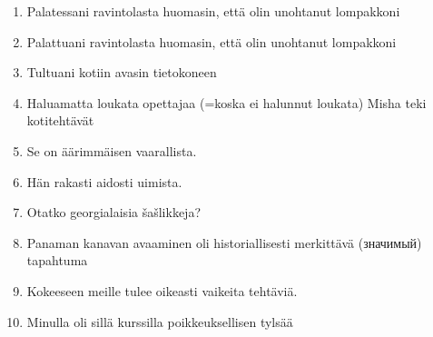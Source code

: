 \documentclass[paper=a4, fontsize=11pt]{scrartcl}
\begin{document}
\begin{enumerate}

    \item Palatessani ravintolasta huomasin, että olin unohtanut lompakkoni \\
            \underline{\hspace{12cm}}

    \item Palattuani ravintolasta huomasin, että olin unohtanut lompakkoni \\
            \underline{\hspace{12cm}}

    \item Tultuani kotiin avasin tietokoneen \\
            \underline{\hspace{12cm}}

    \item Haluamatta loukata opettajaa (=koska ei halunnut loukata) Misha teki kotitehtävät  \\
            \underline{\hspace{12cm}}

    \item Se on äärimmäisen vaarallista. \\
            \underline{\hspace{12cm}}

    \item Hän rakasti aidosti uimista. \\
            \underline{\hspace{12cm}}

    \item Otatko georgialaisia šašlikkeja? \\
            \underline{\hspace{12cm}}

    \item Panaman kanavan avaaminen oli historiallisesti merkittävä (значимый) tapahtuma \\
            \underline{\hspace{12cm}}

    \item Kokeeseen meille tulee oikeasti vaikeita tehtäviä. \\
            \underline{\hspace{12cm}}

    \item Minulla oli sillä kurssilla poikkeuksellisen tylsää \\
            \underline{\hspace{12cm}}


\end{enumerate}
\end{document}
